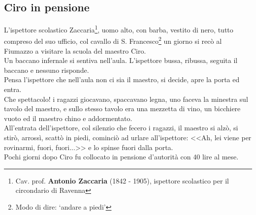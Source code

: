 \subsection{Ciro in pensione}
L'ispettore scolastico Zaccaria\footnote{Cav. prof. \textbf{Antonio Zaccaria} (1842 - 1905), ispettore scolastico per il circondario di Ravenna}, uomo alto, con barba, vestito di nero, tutto compreso del suo ufficio, col cavallo di S. Francesco\footnote{Modo di dire: `andare a piedi'} un giorno si recò al Fiumazzo a visitare la scuola del maestro Ciro.\\
\indent Un baccano infernale si sentiva nell'aula. L'ispettore bussa, ribussa, seguita il baccano e nessuno risponde.\\
\indent Pensa l'ispettore che nell'aula non ci sia il maestro, si decide, apre la porta ed entra.\\
\indent Che spettacolo! i ragazzi giocavano, spaccavano legna, uno faceva la minestra sul tavolo del maestro, e sullo stesso tavolo era una mezzetta di vino, un bicchiere vuoto ed il maestro chino e addormentato.\\
\indent All'entrata dell'ispettore, col silenzio che fecero i ragazzi, il maestro si alzò, si stirò, arrossì, scattò in piedi, cominciò ad urlare all'ispettore: <<Ah, lei viene per rovinarmi, fuori, fuori...>> e lo spinse fuori dalla porta.\\
\indent Pochi giorni dopo Ciro fu collocato in pensione d'autorità con 40 lire al mese.

